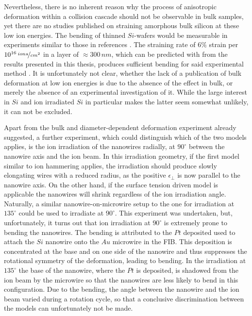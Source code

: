 Nevertheless, there is no inherent reason why the process of anisotropic deformation within a collision cascade should not be observable in bulk samples, yet there are no studies published on straining amorphous bulk silicon at these low ion energies. The bending of thinned $Si$-wafers would be measurable in experiments similar to those in references \cite{volkert_stress_1991,massl_stress_2008}. The straining rate of $6\%$ strain per $10^{16}\,\nicefrac{ions}{cm^2}$ in a layer of $\approx 300\,nm$, which can be predicted with from the results presented in this thesis, produces sufficient bending for said experimental method \cite{flinn_measurement_1987}. It is unfortunately not clear, whether the lack of a publication of bulk deformation at low ion energies is due to the absence of the effect in bulk, or merely the absence of an experimental investigation of it. While the large interest in $Si$ and ion irradiated $Si$ in particular makes the latter seem somewhat unlikely, it can not be excluded.

Apart from the bulk and diameter-dependent deformation experiment already suggested, a further experiment, which could distinguish which of the two models applies, is the ion irradiation of the nanowires radially, at $90^\circ$ between the nanowire axis and the ion beam. In this irradiation geometry, if the first model similar to ion hammering applies, the irradiation should produce slowly elongating wires with a reduced radius, as the positive $\epsilon_{\perp}$ is now parallel to the nanowire axis. On the other hand, if the surface tension driven model is applicable the nanowires will shrink regardless of the ion irradiation angle. Naturally, a similar nanowire-on-microwire setup to the one for irradiation at $135^\circ$ could be used to irradiate at $90^\circ$. This experiment was undertaken, but, unfortunately, it turns out that ion irradiation at $90^\circ$ is extremely prone to bending the nanowires. The bending is attributed to the $Pt$ deposited used to attach the $Si$ nanowire onto the $Au$ microwire in the FIB. This deposition is concentrated at the base and on one side of the nanowire and thus suppresses the rotational symmetry of the deformation, leading to bending. In the irradiation at $135^\circ$ the base of the nanowire, where the $Pt$ is deposited, is shadowed from the ion beam by the microwire so that the nanowires are less likely to bend in this configuration. Due to the bending, the angle between the nanowire and the ion beam varied during a rotation cycle, so that a conclusive discrimination between the models can unfortunately not be made. 


